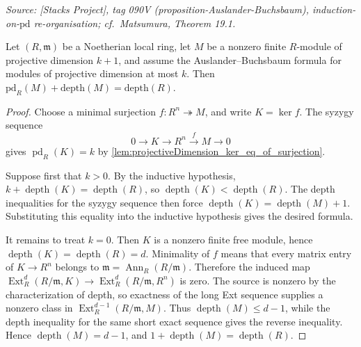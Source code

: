 \begin{lemma}[Auslander--Buchsbaum: inductive step \(\text{pd} = k+1\)]\leanok
  \label{lem:auslander_buchsbaum_formula_succ_pd}
  \textit{Source: [Stacks Project], tag 090V (proposition-Auslander-Buchsbaum),
  induction-on-\(\text{pd}\) re-organisation; cf.\ Matsumura, Theorem 19.1.}

  Let \((R,\mathfrak m)\) be a Noetherian local ring, let \(M\) be a
  nonzero finite \(R\)-module of projective dimension \(k+1\), and assume
  the Auslander--Buchsbaum formula for modules of projective dimension at
  most \(k\). Then
  \(\text{pd}_R(M) + \text{depth}(M) = \text{depth}(R)\).
\end{lemma}
\begin{proof}
  \leanok
  Choose a minimal surjection \(f:R^n\twoheadrightarrow M\), and write
  \(K=\ker f\). The syzygy sequence
  \[
    0\longrightarrow K\longrightarrow R^n\xrightarrow{f}M\longrightarrow 0
  \]
  gives \(\operatorname{pd}_R(K)=k\) by
  \cref{lem:projectiveDimension_ker_eq_of_surjection}.

  Suppose first that \(k>0\). By the inductive hypothesis,
  \(k+\operatorname{depth}(K)=\operatorname{depth}(R)\), so
  \(\operatorname{depth}(K)<\operatorname{depth}(R)\). The depth
  inequalities for the syzygy sequence then force
  \(\operatorname{depth}(K)=\operatorname{depth}(M)+1\). Substituting
  this equality into the inductive hypothesis gives the desired formula.

  It remains to treat \(k=0\). Then \(K\) is a nonzero finite free
  module, hence \(\operatorname{depth}(K)=\operatorname{depth}(R)=d\).
  Minimality of \(f\) means that every matrix entry of
  \(K\to R^n\) belongs to \(\mathfrak m=\operatorname{Ann}_R(R/\mathfrak m)\).
  Therefore the induced map
  \(\operatorname{Ext}^d_R(R/\mathfrak m,K)\to
  \operatorname{Ext}^d_R(R/\mathfrak m,R^n)\) is zero. The source is
  nonzero by the characterization of depth, so exactness of the long
  Ext sequence supplies a nonzero class in
  \(\operatorname{Ext}^{d-1}_R(R/\mathfrak m,M)\). Thus
  \(\operatorname{depth}(M)\leq d-1\), while the depth inequality for
  the same short exact sequence gives the reverse inequality. Hence
  \(\operatorname{depth}(M)=d-1\), and
  \(1+\operatorname{depth}(M)=\operatorname{depth}(R)\).
\end{proof}


